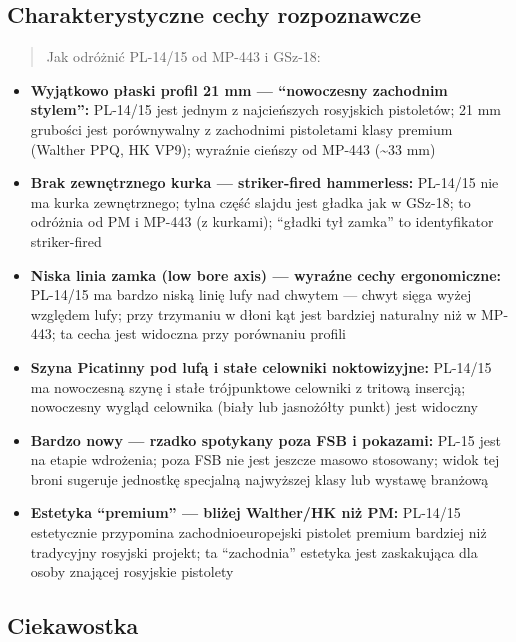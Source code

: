 \documentclass[12pt,oneside]{book}
\providecommand{\tightlist}{%
  \setlength{\itemsep}{0pt}\setlength{\parskip}{0pt}}
\begin{document}
\subsection{Charakterystyczne cechy
rozpoznawcze}\label{charakterystyczne-cechy-rozpoznawcze-113}

\begin{quote}
Jak odróżnić PL-14/15 od MP-443 i GSz-18:
\end{quote}

\begin{itemize}
\tightlist
\item
  \textbf{Wyjątkowo płaski profil 21 mm --- ``nowoczesny zachodnim
  stylem'':} PL-14/15 jest jednym z najcieńszych rosyjskich pistoletów;
  21 mm grubości jest porównywalny z zachodnimi pistoletami klasy
  premium (Walther PPQ, HK VP9); wyraźnie cieńszy od MP-443
  (\textasciitilde33 mm)
\item
  \textbf{Brak zewnętrznego kurka --- striker-fired hammerless:}
  PL-14/15 nie ma kurka zewnętrznego; tylna część slajdu jest gładka jak
  w GSz-18; to odróżnia od PM i MP-443 (z kurkami); ``gładki tył zamka''
  to identyfikator striker-fired
\item
  \textbf{Niska linia zamka (low bore axis) --- wyraźne cechy
  ergonomiczne:} PL-14/15 ma bardzo niską linię lufy nad chwytem ---
  chwyt sięga wyżej względem lufy; przy trzymaniu w dłoni kąt jest
  bardziej naturalny niż w MP-443; ta cecha jest widoczna przy
  porównaniu profili
\item
  \textbf{Szyna Picatinny pod lufą i stałe celowniki noktowizyjne:}
  PL-14/15 ma nowoczesną szynę i stałe trójpunktowe celowniki z tritową
  insercją; nowoczesny wygląd celownika (biały lub jasnożółty punkt)
  jest widoczny
\item
  \textbf{Bardzo nowy --- rzadko spotykany poza FSB i pokazami:} PL-15
  jest na etapie wdrożenia; poza FSB nie jest jeszcze masowo stosowany;
  widok tej broni sugeruje jednostkę specjalną najwyższej klasy lub
  wystawę branżową
\item
  \textbf{Estetyka ``premium'' --- bliżej Walther/HK niż PM:} PL-14/15
  estetycznie przypomina zachodnioeuropejski pistolet premium bardziej
  niż tradycyjny rosyjski projekt; ta ``zachodnia'' estetyka jest
  zaskakująca dla osoby znającej rosyjskie pistolety
\end{itemize}

\subsection{Ciekawostka}\label{ciekawostka-113}
\end{document}
